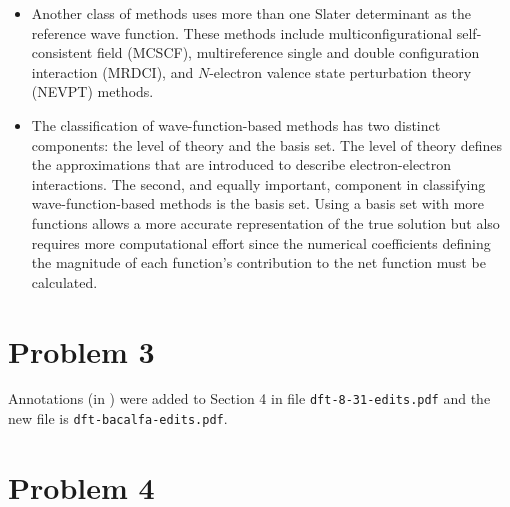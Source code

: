 \documentclass[letter, 12pt]{article}
\begin{document}
\begin{itemize}
	\item Another class of methods uses more than one Slater determinant as the reference wave function. These methods include multiconfigurational self-consistent field (MCSCF), multireference single and double configuration interaction (MRDCI), and $N$-electron valence state perturbation theory (NEVPT) methods.
	
	\item The classification of wave-function-based methods has two distinct components: the level of theory and the basis set. The level of theory defines the approximations that are introduced to describe electron-electron interactions. The second, and equally important, component in classifying wave-function-based methods is the basis set. Using a basis set with more functions allows a more accurate representation of the true solution but also requires more computational effort since the numerical coefficients defining the magnitude of each function's contribution to the net function must be calculated.
\end{itemize}



\section*{Problem 3}

Annotations (in {\color{red}{red}}) were added to Section 4 in file \texttt{dft-8-31-edits.pdf} and the new file is \texttt{dft-bacalfa-edits.pdf}.



\section*{Problem 4}
\end{document}
